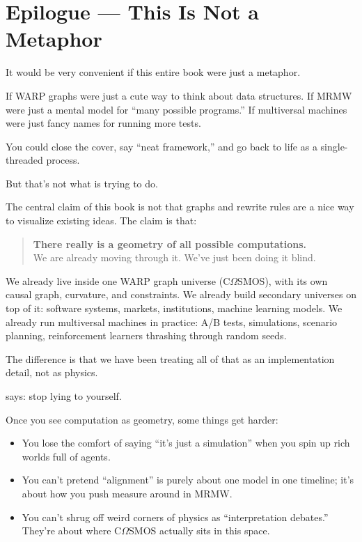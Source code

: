 \chapter{Epilogue — This Is Not a Metaphor}

It would be very convenient if this entire book were just a metaphor.

If WARP graphs were just a cute way to think about data structures.  
If MRMW were just a mental model for “many possible programs.”  
If multiversal machines were just fancy names for running more tests.

You could close the cover, say “neat framework,” and go back to life as a
single-threaded process.

But that’s not what \COMPUTER{} is trying to do.

\medskip

The central claim of this book is not that graphs and rewrite rules are
a nice way to visualize existing ideas. The claim is that:

\begin{quote}
\textbf{There really is a geometry of all possible computations.}\\
We are already moving through it. We’ve just been doing it blind.
\end{quote}

We already live inside one WARP graph universe (C$\Omega$SMOS), with its own causal
graph, curvature, and constraints. We already build secondary universes on top
of it: software systems, markets, institutions, machine learning models.
We already run multiversal machines in practice: A/B tests, simulations,
scenario planning, reinforcement learners thrashing through random seeds.

The difference is that we have been treating all of that as an implementation
detail, not as physics.

\COMPUTER{} says: stop lying to yourself.

\medskip

Once you see computation as geometry, some things get harder:

\begin{itemize}
  \item You lose the comfort of saying ``it’s just a simulation'' when you spin
        up rich worlds full of agents.

  \item You can’t pretend ``alignment'' is purely about one model in one timeline;
        it’s about how you push measure around in MRMW.

  \item You can’t shrug off weird corners of physics as “interpretation debates.”
        They’re about where C$\Omega$SMOS actually sits in this space.
\end{itemize}

